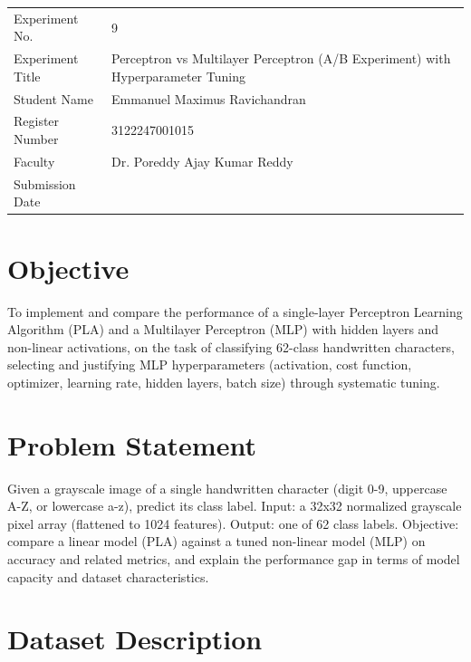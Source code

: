 \documentclass[11pt]{article}
\author{Emmanuel Maximus}
\date{\today}
\title{}
\begin{document}
\tableofcontents

\begin{center}
\begin{tabular}{ll}
\hline
Experiment No. & 9\\
Experiment Title & Perceptron vs Multilayer Perceptron (A/B Experiment) with Hyperparameter Tuning\\
Student Name & Emmanuel Maximus Ravichandran\\
Register Number & 3122247001015\\
Faculty & Dr. Poreddy Ajay Kumar Reddy\\
Submission Date & \\
\hline
\end{tabular}
\end{center}

\section{Objective}
\label{sec:orgbef1a32}

To implement and compare the performance of a single-layer Perceptron Learning Algorithm
(PLA) and a Multilayer Perceptron (MLP) with hidden layers and non-linear activations, on
the task of classifying 62-class handwritten characters, selecting and justifying MLP
hyperparameters (activation, cost function, optimizer, learning rate, hidden layers, batch
size) through systematic tuning.

\section{Problem Statement}
\label{sec:orgb8704c1}

Given a grayscale image of a single handwritten character (digit 0-9, uppercase A-Z, or
lowercase a-z), predict its class label. Input: a 32x32 normalized grayscale pixel array
(flattened to 1024 features). Output: one of 62 class labels. Objective: compare a linear
model (PLA) against a tuned non-linear model (MLP) on accuracy and related metrics, and
explain the performance gap in terms of model capacity and dataset characteristics.

\section{Dataset Description}
\label{sec:org38585dd}
\end{document}

